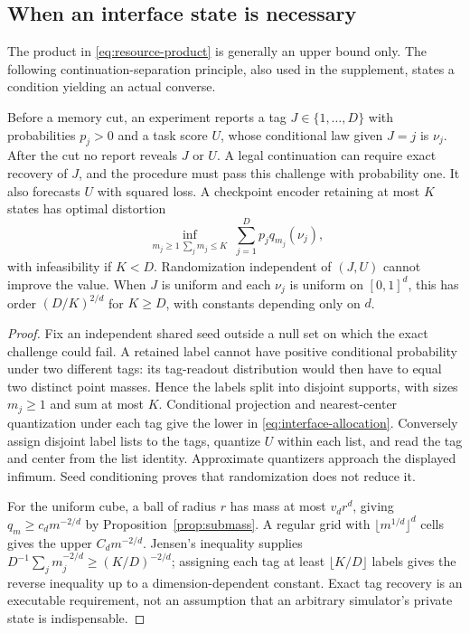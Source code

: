 \subsection{When an interface state is necessary}
The product in \eqref{eq:resource-product} is generally an upper bound only. The following continuation-separation principle, also used in the supplement, states a condition yielding an actual converse.

\begin{proposition}\label{prop:interface}
Before a memory cut, an experiment reports a tag $J\in\{1,\ldots,D\}$ with probabilities $p_j>0$ and a task score $U$, whose conditional law given $J=j$ is $\nu_j$. After the cut no report reveals $J$ or $U$. A legal continuation can require exact recovery of $J$, and the procedure must pass this challenge with probability one. It also forecasts $U$ with squared loss. A checkpoint encoder retaining at most $K$ states has optimal distortion
\begin{equation}\label{eq:interface-allocation}
 \inf_{\substack{m_j\ge1\ \sum_jm_j\le K}}
       \sum_{j=1}^D p_j q_{m_j}(\nu_j),
\end{equation}
with infeasibility if $K<D$. Randomization independent of $(J,U)$ cannot improve the value. When $J$ is uniform and each $\nu_j$ is uniform on $[0,1]^d$, this has order $(D/K)^{2/d}$ for $K\ge D$, with constants depending only on $d$.
\end{proposition}
\begin{proof}
Fix an independent shared seed outside a null set on which the exact challenge could fail. A retained label cannot have positive conditional probability under two different tags: its tag-readout distribution would then have to equal two distinct point masses. Hence the labels split into disjoint supports, with sizes $m_j\ge1$ and sum at most $K$. Conditional projection and nearest-center quantization under each tag give the lower in \eqref{eq:interface-allocation}. Conversely assign disjoint label lists to the tags, quantize $U$ within each list, and read the tag and center from the list identity. Approximate quantizers approach the displayed infimum. Seed conditioning proves that randomization does not reduce it.

For the uniform cube, a ball of radius $r$ has mass at most $v_dr^d$, giving $q_m\ge c_dm^{-2/d}$ by Proposition~\ref{prop:submass}. A regular grid with $\lfloor m^{1/d}\rfloor^d$ cells gives the upper $C_dm^{-2/d}$. Jensen's inequality supplies $D^{-1}\sum_j m_j^{-2/d}\ge(K/D)^{-2/d}$; assigning each tag at least $\lfloor K/D\rfloor$ labels gives the reverse inequality up to a dimension-dependent constant. Exact tag recovery is an executable requirement, not an assumption that an arbitrary simulator's private state is indispensable.
\end{proof}

